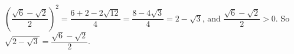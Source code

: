 $\left(\dfrac{\sqrt6-\sqrt2}{2}\right)^2=\dfrac{6+2-2\sqrt{12}}{4}=\dfrac{8-4\sqrt3}{4}=2-\sqrt3$, and $\dfrac{\sqrt6-\sqrt2}{2}>0$. So $\sqrt{2-\sqrt3}=\boxed{\dfrac{\sqrt6-\sqrt2}{2}}$.
